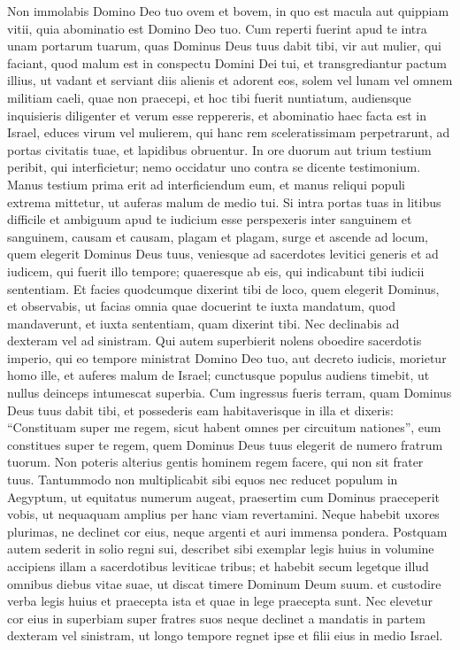 \begin{biblechapter} 
\verse Non immolabis Domino Deo tuo ovem et bovem, in quo est macula aut quippiam vitii, quia abominatio est Domino Deo tuo. 
\verse Cum reperti fuerint apud te intra unam portarum tuarum, quas Dominus Deus tuus dabit tibi, vir aut mulier, qui faciant, quod malum est in conspectu Domini Dei tui, et transgrediantur pactum illius, 
\verse ut vadant et serviant diis alienis et adorent eos, solem vel lunam vel omnem militiam caeli, quae non praecepi,  
\verse et hoc tibi fuerit nuntiatum, audiensque inquisieris diligenter et verum esse reppereris, et abominatio haec facta est in Israel, 
\verse educes virum vel mulierem, qui hanc rem sceleratissimam perpetrarunt, ad portas civitatis tuae, et lapidibus obruentur. 
\verse In ore duorum aut trium testium peribit, qui interficietur; nemo occidatur uno contra se dicente testimonium. 
\verse Manus testium prima erit ad interficiendum eum, et manus reliqui populi extrema mittetur, ut auferas malum de medio tui. 
\verse Si intra portas tuas in litibus difficile et ambiguum apud te iudicium esse perspexeris inter sanguinem et sanguinem, causam et causam, plagam et plagam, surge et ascende ad locum, quem elegerit Dominus Deus tuus, 
\verse veniesque ad sacerdotes levitici generis et ad iudicem, qui fuerit illo tempore; quaeresque ab eis, qui indicabunt tibi iudicii sententiam. 
\verse Et facies quodcumque dixerint tibi de loco, quem elegerit Dominus, et observabis, ut facias omnia quae docuerint te 
\verse iuxta mandatum, quod mandaverunt, et iuxta sententiam, quam dixerint tibi. Nec declinabis ad dexteram vel ad sinistram. 
\verse Qui autem superbierit nolens oboedire sacerdotis imperio, qui eo tempore ministrat Domino Deo tuo, aut decreto iudicis, morietur homo ille, et auferes malum de Israel; 
\verse cunctusque populus audiens timebit, ut nullus deinceps intumescat superbia. 
\verse Cum ingressus fueris terram, quam Dominus Deus tuus dabit tibi, et possederis eam habitaverisque in illa et dixeris: “Constituam super me regem, sicut habent omnes per circuitum nationes”, 
\verse eum constitues super te regem, quem Dominus Deus tuus elegerit de numero fratrum tuorum. Non poteris alterius gentis hominem regem facere, qui non sit frater tuus. 
\verse Tantummodo non multiplicabit sibi equos nec reducet populum in Aegyptum, ut equitatus numerum augeat, praesertim cum Dominus praeceperit vobis, ut nequaquam amplius per hanc viam revertamini. 
\verse Neque habebit uxores plurimas, ne declinet cor eius, neque argenti et auri immensa pondera. 
\verse Postquam autem sederit in solio regni sui, describet sibi exemplar legis huius in volumine accipiens illam a sacerdotibus leviticae tribus; 
\verse et habebit secum legetque illud omnibus diebus vitae suae, ut discat timere Dominum Deum suum. et custodire verba legis huius et praecepta ista et quae in lege praecepta sunt.  
\verse Nec elevetur cor eius in superbiam super fratres suos neque declinet a mandatis in partem dexteram vel sinistram, ut longo tempore regnet ipse et filii eius in medio Israel. 
\end{biblechapter}

